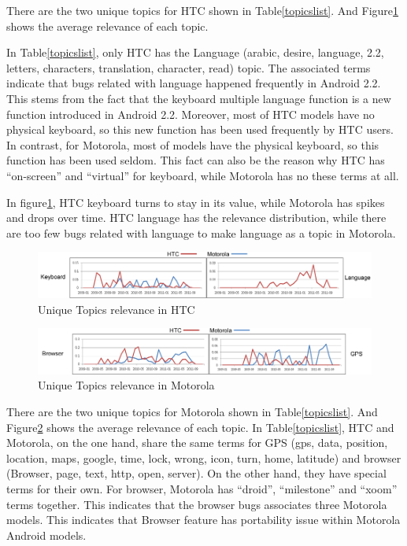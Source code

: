 \documentclass[10pt, conference, compsocconf]{IEEEtran}
\begin{document}
There are the two unique topics for HTC shown in Table\ref{topicslist}. And Figure\ref{uniquehtc} shows the average relevance of each topic.

In Table\ref{topicslist}, only HTC has the Language (arabic, desire, language, 2.2, letters, characters, translation, character, read) topic. The associated terms indicate that bugs related with language happened frequently in Android 2.2. This stems from the fact that the keyboard multiple language function is a new function introduced in Android 2.2. Moreover, most of HTC models have no physical keyboard, so this new function has been used frequently by HTC users. In contrast, for Motorola, most of models have the physical keyboard, so this function has been used seldom. This fact can also be the reason why HTC has “on-screen” and “virtual” for keyboard, while Motorola has no these terms at all.

In figure\ref{uniquehtc}, HTC keyboard turns to stay in its value, while Motorola has spikes and drops over time. HTC language has the relevance distribution, while there are too few bugs related with language to make language as a topic in Motorola.

\begin{figure}[htb]
\centering
\includegraphics[width=1\textwidth]{uniquehtc.png}
\caption{Unique Topics relevance in HTC}
\label{uniquehtc}
\end{figure}

\begin{figure}[htb]
\centering
\includegraphics[width=1\textwidth]{uniquemoto.png}
\caption{Unique Topics relevance in Motorola}
\label{uniquemoto}
\end{figure}


There are the two unique topics for Motorola shown in Table\ref{topicslist}. And Figure\ref{uniquemoto} shows the average relevance of each topic.
In Table\ref{topicslist}, HTC and Motorola, on the one hand, share the same terms for GPS (gps, data, position, location, maps, google, time, lock, wrong, icon, turn, home, latitude) and browser (Browser, page, text, http, open, server). On the other hand, they have special terms for their own. For browser, Motorola has “droid”, “milestone” and “xoom” terms together. This indicates that the browser bugs associates three Motorola models. This indicates that Browser feature has portability issue within Motorola Android models.
\end{document}
